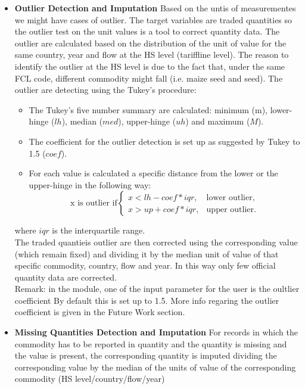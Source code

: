 \documentclass[nojss]{jss}\usepackage[]{graphicx}\usepackage[]{color}
\begin{document}
\begin{itemize}
\item {\bf Outlier Detection and Imputation} Based on the untis of measurementes we might have cases of outlier. The target variables are traded quantities so the outlier test on the unit values is a tool to correct quantity data. The outlier are calculated based on the distribution of the unit of value for the same country, year and flow at the HS level (tariffline level). The reason to identify the outlier at the HS level is due to the fact that, under the same FCL code, different commodity might fall (i.e. maize seed and seed). The outlier are detecting using the Tukey's procedure:
\begin{itemize}
\item The Tukey's five number summary are calculated: minimum (m), lower-hinge ($lh$), median ($med$), upper-hinge ($uh$) and maximum ($M$).
\item The coefficient for the outlier detection is set up as suggested by Tukey to 1.5 ($coef$).
\item For each value is calculated a specific distance from the lower or the upper-hinge in the following way:
\begin{equation}
\text{x is outlier if} \begin{cases}
    x < lh - coef * iqr, & \text{lower outlier},\\
    x > up + coef * iqr, & \text{upper outlier}.
  \end{cases}
\end{equation}
\end{itemize}
where $iqr$ is the interquartile range.\\

The traded quantieis outlier are then corrected using the corresponding value (which remain fixed) and dividing it by the median unit of value of that specific commodity, country, flow and year. In this way only few official quantity data are corrected.\\
Remark: in the module, one of the input parameter for the user is the oultlier coefficient By default this is set up to 1.5. More info regaring the outlier coefficient is given in the Future Work section.

\item {\bf Missing Quantities Detection and Imputation} For records in which the commodity has to be reported in quantity and the quantity is missing and the value is present, the corresponding quantity is imputed dividing the corresponding value by the median of the units of value of the corresponding commodity (HS level/country/flow/year)
\end{itemize}
\end{document}
